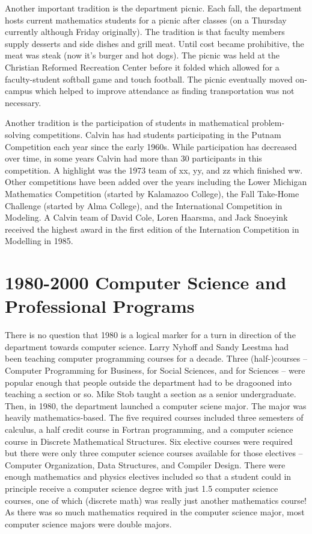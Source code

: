 \documentclass[
]{book}
\begin{document}
Another important tradition is the department picnic. Each fall, the department hosts current mathematics students for a picnic after classes (on a Thursday currently although Friday originally). The tradition is that faculty members supply desserts and side dishes and grill meat. Until cost became prohibitive, the meat was steak (now it's burger and hot dogs).
The picnic was held at the Christian Reformed Recreation Center before it folded which allowed for a faculty-student softball game and touch football. The picnic eventually moved on-campus which helped to improve attendance as finding transportation was not necessary.

Another tradition is the participation of students in mathematical problem-solving competitions. Calvin has had students participating in the Putnam Competition each year since the early 1960s. While participation has decreased over time, in some years Calvin had more than 30 participants in this competition. A highlight was the 1973 team of xx, yy, and zz which finished ww. Other competitions have been added over the years including the Lower Michigan Mathematics Competition (started by Kalamazoo College), the Fall Take-Home Challenge (started by Alma College), and the International Competition in Modeling. A Calvin team of David Cole, Loren Haarsma, and Jack Snoeyink received the highest award in the first edition of the Internation Competition in Modelling in 1985.

\hypertarget{computer-science-and-professional-programs}{%
\chapter{1980-2000 Computer Science and Professional Programs}\label{computer-science-and-professional-programs}}

There is no question that 1980 is a logical marker for a turn in direction of the department towards computer science. Larry Nyhoff and Sandy Leestma had been teaching computer programming courses for a decade. Three (half-)courses -- Computer Programming for Business, for Social Sciences, and for Sciences -- were popular enough that people outside the department had to be dragooned into teaching a section or so. Mike Stob taught a section as a senior undergraduate. Then, in 1980, the department launched a computer sciene major. The major was heavily mathematics-based. The five required courses included three semesters of calculus, a half credit course in Fortran programming, and a computer science course in Discrete Mathematical Structures. Six elective courses were required but there were only three computer science courses available for those electives -- Computer Organization, Data Structures, and Compiler Design. There were enough mathematics and physics electives included so that a student could in principle receive a computer science degree with just 1.5 computer science courses, one of which (discrete math) was really just another mathematics course! As there was so much mathematics required in the computer science major, most computer science majors were double majors.
\end{document}
